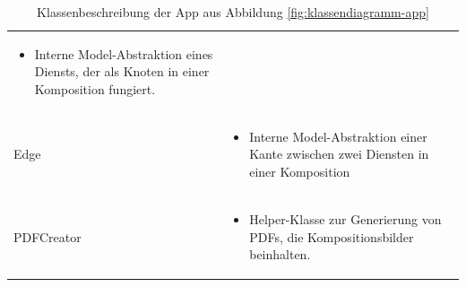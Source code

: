 \begin{table}[h]
\begin{tabularx}{\textwidth}{p{} X}
\begin{itemize}
		\item Interne Model-Abstraktion eines Diensts, der als Knoten in einer Komposition fungiert. 
		\end{itemize}\\
		\rowcolor[HTML]{E7E7E7} 
		Edge & \compress \begin{itemize}
				 \item Interne Model-Abstraktion einer Kante zwischen zwei Diensten in einer Komposition 
				 \end{itemize} \\
		PDFCreator & \compress  \begin{itemize}
\item Helper-Klasse zur Generierung von PDFs, die Kompositionsbilder beinhalten. \end{itemize}\\	\end{tabularx}
	\caption{Klassenbeschreibung der App aus Abbildung \ref{fig:klassendiagramm-app}}
	\label{table:klassenbeschreibung-a}
\end{table}

